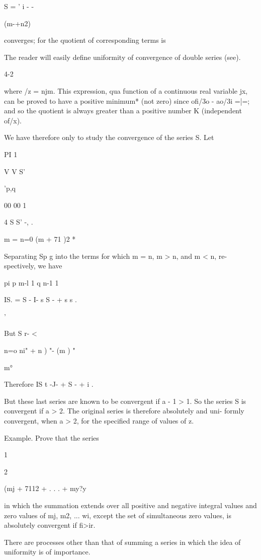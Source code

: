 S = ' i - -

(m-+n2)

converges; for the quotient of corresponding terms is

The reader will easily define uniformity of convergence of double
series (see).

4-2

%
%

where /z = njm. This expression, qua function of a continuous real
variable jx, can be proved to have a positive minimum* (not zero)
since ofi/3o - ao/3i =|=; and so the quotient is always greater than
a positive number K (independent of/x).

We have therefore only to study the convergence of the series S. Let

PI 1

V V S'

 'p,q

00 00 1

 4 S S' -, .

m = n=0 (m + 71 )2 *

Separating Sp g into the terms for which m = n, m > n, and m < n, re-
spectively, we have

pi p m-l 1 q n-1 1

IS. = S - I- s S - + s s .

'%

But S r- <

n=o ni" + n ) "- (m ) "

m°

Therefore IS t -J- + S - + i .

But these last series are known to be convergent if a - 1 > 1. So the
series S is convergent if a > 2. The original series is therefore
absolutely and uni- formly convergent, when a > 2, for the specified
range of values of z.

Example. Prove that the series

1

2

(mj + 7112 + . . . + my?y

in which the summation extends over all positive and negative integral
values and zero values of mj, m2, ... wi, except the set of
simultaneous zero values, is absolutely convergent if fi>ir.


There are processes other than that of summing a series in which the
idea of uniformity is of importance.

